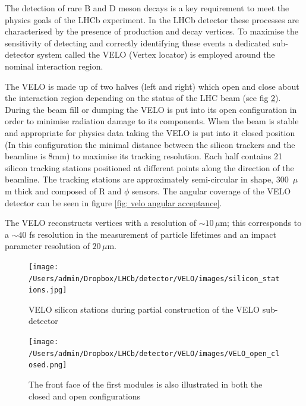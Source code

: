 
The detection of rare B and D meson decays is a key requirement to meet the physics goals of the LHCb experiment.  In the LHCb detector these processes are characterised by the presence of production and decay vertices. To maximise the sensitivity of detecting and correctly identifying these events a dedicated sub-detector system called the VELO (Vertex locator) is employed around the nominal interaction region.

The VELO is made up of two halves (left and right) which open and close about the interaction region depending on the status of the LHC beam (see fig \ref{fig: VELO layout}). During the beam fill or dumping the VELO is put into its open configuration in order to minimise radiation damage to its components. When the beam is stable and appropriate for physics data taking the VELO is put into it closed position (In this configuration the minimal distance between the silicon trackers and the beamline is 8mm) to maximise its tracking resolution. Each half contains 21 silicon tracking stations positioned at different points along the direction of the beamline. The tracking stations are approximately semi-circular in shape, 300 \,$\mu$m thick and composed of R and $\phi$ sensors. The angular coverage of the VELO detector can be seen in figure \ref{fig: velo angular acceptance}.

The VELO reconstructs vertices with a resolution of $\sim10\,\mu$m; this corresponds to a $\sim40$ fs resolution in the measurement of particle lifetimes and an impact parameter resolution of $20\,\mu$m. %
\begin{figure}
	\centering
	\texttt{[image: /Users/admin/Dropbox/LHCb/detector/VELO/images/silicon\_stations.jpg]}
	\caption{VELO silicon stations during partial construction of the VELO sub-detector}
	\label{fig: VELO_silicon_stations}
\end{figure}

\begin{figure}
	\centering
	\texttt{[image: /Users/admin/Dropbox/LHCb/detector/VELO/images/VELO\_open\_closed.png]}
	\caption{The front face of the first modules is also illustrated in both the closed and open configurations}
	\label{fig: VELO layout}
\end{figure}

